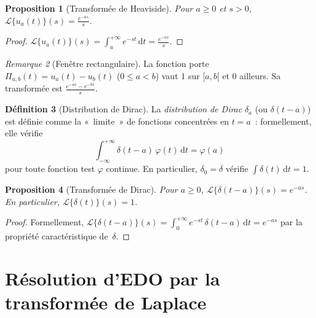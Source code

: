 \documentclass[12pt,a4paper,openany]{book}
\theoremstyle{definition}
\newtheorem{definition}{Définition}[chapter]
\theoremstyle{plain}
\newtheorem{proposition}[definition]{Proposition}
\theoremstyle{remark}
\newtheorem{remarque}[definition]{Remarque}
\newcommand{\dd}{\mathrm{d}}
\begin{document}
\begin{proposition}[Transformée de Heaviside]\label{prop:laplace-heaviside}
  Pour $a\geq 0$ et $s>0$,
  $\displaystyle\mathcal{L}\{u_a(t)\}(s)=\frac{e^{-as}}{s}$.
\end{proposition}

\begin{proof}
  $\displaystyle\mathcal{L}\{u_a(t)\}(s)
  =\int_a^{+\infty}e^{-st}\,\dd t
  =\frac{e^{-as}}{s}$.
\end{proof}

\begin{remarque}[Fenêtre rectangulaire]\label{rem:fenetre}
  La fonction porte $\Pi_{a,b}(t)=u_a(t)-u_b(t)$ ($0\leq a<b$)
  vaut $1$ sur $[a,b[$ et $0$ ailleurs. Sa transformée est
  $\frac{e^{-as}-e^{-bs}}{s}$.
\end{remarque}

\begin{definition}[Distribution de Dirac]\label{def:dirac}
  La \emph{distribution de Dirac} $\delta_a$ (ou $\delta(t-a)$) est
  définie comme la «~limite~» de fonctions concentrées en $t=a$~:
  formellement, elle vérifie
  \[
    \int_{-\infty}^{+\infty}\delta(t-a)\,\varphi(t)\,\dd t = \varphi(a)
  \]
  pour toute fonction test $\varphi$ continue. En particulier,
  $\delta_0=\delta$ vérifie $\int\delta(t)\,\dd t=1$.
\end{definition}

\begin{proposition}[Transformée de Dirac]\label{prop:laplace-dirac}
  Pour $a\geq 0$,
  $\mathcal{L}\{\delta(t-a)\}(s)=e^{-as}$.
  En particulier, $\mathcal{L}\{\delta(t)\}(s)=1$.
\end{proposition}

\begin{proof}
  Formellement,
  $\mathcal{L}\{\delta(t-a)\}(s)
  =\int_0^{+\infty}e^{-st}\,\delta(t-a)\,\dd t=e^{-as}$
  par la propriété caractéristique de~$\delta$.
\end{proof}

\section{Résolution d'EDO par la transformée de Laplace}\label{sec:resolution-laplace}
\end{document}
